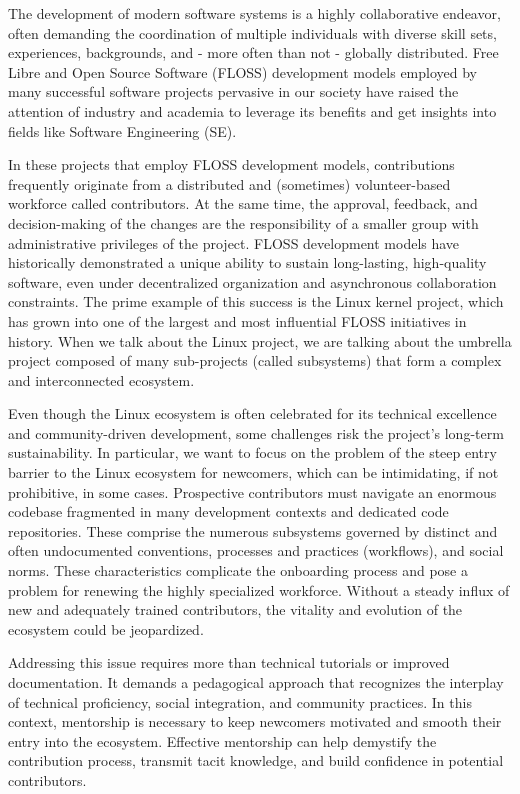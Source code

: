 The development of modern software systems is a highly collaborative endeavor, often demanding the coordination of multiple individuals with diverse skill sets, experiences, backgrounds, and - more often than not - globally distributed. Free Libre and Open Source Software (FLOSS) development models employed by many successful software projects pervasive in our society have raised the attention of industry and academia to leverage its benefits and get insights into fields like Software Engineering (SE).

In these projects that employ FLOSS development models, contributions frequently originate from a distributed and (sometimes) volunteer-based workforce called contributors. At the same time, the approval, feedback, and decision-making of the changes are the responsibility of a smaller group with administrative privileges of the project. FLOSS development models have historically demonstrated a unique ability to sustain long-lasting, high-quality software, even under decentralized organization and asynchronous collaboration constraints. The prime example of this success is the Linux kernel project, which has grown into one of the largest and most influential FLOSS initiatives in history. When we talk about the Linux project, we are talking about the umbrella project composed of many sub-projects (called subsystems) that form a complex and interconnected ecosystem.

Even though the Linux ecosystem is often celebrated for its technical excellence and community-driven development, some challenges risk the project's long-term sustainability. In particular, we want to focus on the problem of the steep entry barrier to the Linux ecosystem for newcomers, which can be intimidating, if not prohibitive, in some cases. Prospective contributors must navigate an enormous codebase fragmented in many development contexts and dedicated code repositories. These comprise the numerous subsystems governed by distinct and often undocumented conventions, processes and practices (workflows), and social norms. These characteristics complicate the onboarding process and pose a problem for renewing the highly specialized workforce. Without a steady influx of new and adequately trained contributors, the vitality and evolution of the ecosystem could be jeopardized.

Addressing this issue requires more than technical tutorials or improved documentation. It demands a pedagogical approach that recognizes the interplay of technical proficiency, social integration, and community practices. In this context, mentorship is necessary to keep newcomers motivated and smooth their entry into the ecosystem. Effective mentorship can help demystify the contribution process, transmit tacit knowledge, and build confidence in potential contributors.

